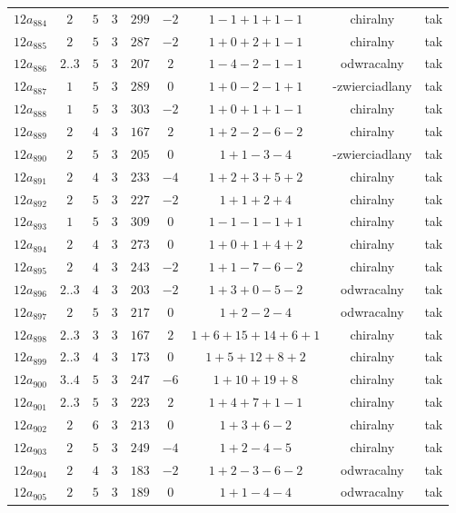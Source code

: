 \begin{longtable}{ccccccccc}
$12a_{884}$ & $2$ & $5$ & $3$ & $299$ & $-2$ & $1-1+1+1-1$ & chiralny & tak \\
$12a_{885}$ & $2$ & $5$ & $3$ & $287$ & $-2$ & $1+0+2+1-1$ & chiralny & tak \\
$12a_{886}$ & $2..3$ & $5$ & $3$ & $207$ & $2$ & $1-4-2-1-1$ & odwracalny & tak \\
$12a_{887}$ & $1$ & $5$ & $3$ & $289$ & $0$ & $1+0-2-1+1$ & -zwierciadlany & tak \\
$12a_{888}$ & $1$ & $5$ & $3$ & $303$ & $-2$ & $1+0+1+1-1$ & chiralny & tak \\
$12a_{889}$ & $2$ & $4$ & $3$ & $167$ & $2$ & $1+2-2-6-2$ & chiralny & tak \\
$12a_{890}$ & $2$ & $5$ & $3$ & $205$ & $0$ & $1+1-3-4$ & -zwierciadlany & tak \\
$12a_{891}$ & $2$ & $4$ & $3$ & $233$ & $-4$ & $1+2+3+5+2$ & chiralny & tak \\
$12a_{892}$ & $2$ & $5$ & $3$ & $227$ & $-2$ & $1+1+2+4$ & chiralny & tak \\
$12a_{893}$ & $1$ & $5$ & $3$ & $309$ & $0$ & $1-1-1-1+1$ & chiralny & tak \\
$12a_{894}$ & $2$ & $4$ & $3$ & $273$ & $0$ & $1+0+1+4+2$ & chiralny & tak \\
$12a_{895}$ & $2$ & $4$ & $3$ & $243$ & $-2$ & $1+1-7-6-2$ & chiralny & tak \\
$12a_{896}$ & $2..3$ & $4$ & $3$ & $203$ & $-2$ & $1+3+0-5-2$ & odwracalny & tak \\
$12a_{897}$ & $2$ & $5$ & $3$ & $217$ & $0$ & $1+2-2-4$ & odwracalny & tak \\
$12a_{898}$ & $2..3$ & $3$ & $3$ & $167$ & $2$ & $1+6+15+14+6+1$ & chiralny & tak \\
$12a_{899}$ & $2..3$ & $4$ & $3$ & $173$ & $0$ & $1+5+12+8+2$ & chiralny & tak \\
$12a_{900}$ & $3..4$ & $5$ & $3$ & $247$ & $-6$ & $1+10+19+8$ & chiralny & tak \\
$12a_{901}$ & $2..3$ & $5$ & $3$ & $223$ & $2$ & $1+4+7+1-1$ & chiralny & tak \\
$12a_{902}$ & $2$ & $6$ & $3$ & $213$ & $0$ & $1+3+6-2$ & chiralny & tak \\
$12a_{903}$ & $2$ & $5$ & $3$ & $249$ & $-4$ & $1+2-4-5$ & chiralny & tak \\
$12a_{904}$ & $2$ & $4$ & $3$ & $183$ & $-2$ & $1+2-3-6-2$ & odwracalny & tak \\
$12a_{905}$ & $2$ & $5$ & $3$ & $189$ & $0$ & $1+1-4-4$ & odwracalny & tak \\

\end{longtable}
